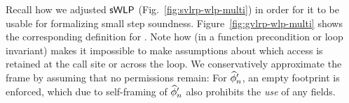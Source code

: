 \documentclass {llncs}
\begin{document}
Recall how we adjusted $\textup{\textmd{\textsf{sWLP}}}$ (Fig.~\ref{fig:svlrp-wlp-multi}) in order for it to be usable for formalizing small step soundness.
Figure~\ref{fig:gvlrp-wlp-multi} shows the corresponding definition for \gvlrp.
Note how \imprA (in a function precondition or loop invariant) makes it impossible to make assumptions about which access is retained at the call site or across the loop. %
We conservatively approximate the frame by assuming that no permissions remain:
For $\widehat{\phi}'_n$, an empty footprint is enforced, which due to self-framing of $\widehat{\phi}'_n$ also prohibits the {\em use} of any fields.%

\end{document}
